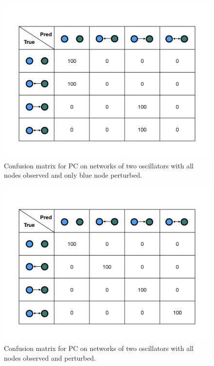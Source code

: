 \documentclass[]{article}
\begin{document}
\begin{figure}
    \centering
    \includegraphics[width=12cm]{Pert1ConfusionMatrix.jpeg}
    \caption{Confusion matrix for PC on networks of two oscillators with all nodes observed and only blue node perturbed.}
    \label{fig:example}
\end{figure}

\begin{figure}
    \centering
    \includegraphics[width=12cm]{Pert2ConfusionMatrix.jpeg}
    \caption{Confusion matrix for PC on networks of two oscillators with all nodes observed and perturbed.}
    \label{fig:example}
\end{figure}
\end{document}
